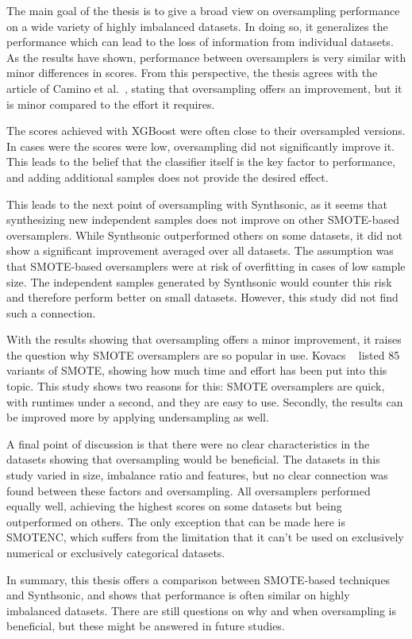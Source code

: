 The main goal of the thesis is to give a broad view on oversampling performance on a wide variety of highly imbalanced datasets. In doing so, it generalizes the performance which can lead to the loss of information from individual datasets. As the results have shown, performance between oversamplers is very similar with minor differences in scores. From this perspective, the thesis agrees with the article of Camino et al.~\cite{Camino2020OversamplingEffort}, stating that oversampling offers an improvement, but it is minor compared to the effort it requires. 

The scores achieved with XGBoost were often close to their oversampled versions. In cases were the scores were low, oversampling did not significantly improve it. This leads to the belief that the classifier itself is the key factor to performance, and adding additional samples does not provide the desired effect. 

This leads to the next point of oversampling with Synthsonic, as it seems that synthesizing new independent samples does not improve on other SMOTE-based oversamplers. While Synthsonic outperformed others on some datasets, it did not show a significant improvement averaged over all datasets. The assumption was that SMOTE-based oversamplers were at risk of overfitting in cases of low sample size. The independent samples generated by Synthsonic would counter this risk and therefore perform better on small datasets. However, this study did not find such a connection. 

With the results showing that oversampling offers a minor improvement, it raises the question why SMOTE oversamplers are so popular in use. Kovacs ~\cite{Kovacs2019AnDatasets} listed 85 variants of SMOTE, showing how much time and effort has been put into this topic. This study shows two reasons for this: SMOTE oversamplers are quick, with runtimes under a second, and they are easy to use. Secondly, the results can be improved more by applying undersampling as well. 

A final point of discussion is that there were no clear characteristics in the datasets showing that oversampling would be beneficial. The datasets in this study varied in size, imbalance ratio and features, but no clear connection was found between these factors and oversampling. All oversamplers performed equally well, achieving the highest scores on some datasets but being outperformed on others. The only exception that can be made here is SMOTENC, which suffers from the limitation that it can't be used on exclusively numerical or exclusively categorical datasets.

In summary, this thesis offers a comparison between SMOTE-based techniques and Synthsonic, and shows that performance is often similar on highly imbalanced datasets. There are still questions on why and when oversampling is beneficial, but these might be answered in future studies.  